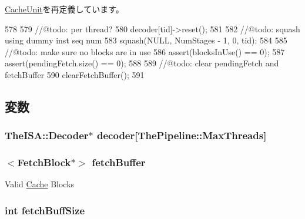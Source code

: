 \hyperlink{classCacheUnit_abf76d6d245f7d3b17d26ea8dcc0cf36f}{CacheUnit}を再定義しています。


\begin{DoxyCode}
578 {
579     //@todo: per thread?
580     decoder[tid]->reset();
581 
582     //@todo: squash using dummy inst seq num
583     squash(NULL, NumStages - 1, 0, tid);
584 
585     //@todo: make sure no blocks are in use
586     assert(blocksInUse() == 0);
587     assert(pendingFetch.size() == 0);
588 
589     //@todo: clear pendingFetch and fetchBuffer
590     clearFetchBuffer();
591 }
\end{DoxyCode}


\subsection{変数}
\hypertarget{classFetchUnit_a5f15f1b871b77f550632262df3bce5f1}{
\subsubsection[{decoder}]{\setlength{\rightskip}{0pt plus 5cm}TheISA::Decoder$\ast$ {\bf decoder}\mbox{[}{\bf ThePipeline::MaxThreads}\mbox{]}}}
\label{classFetchUnit_a5f15f1b871b77f550632262df3bce5f1}
\hypertarget{classFetchUnit_ab201075a98e275240766bee54144d42d}{
\subsubsection[{fetchBuffer}]{$<${\bf FetchBlock}$\ast$$>$ {\bf fetchBuffer}}}
\label{classFetchUnit_ab201075a98e275240766bee54144d42d}
Valid \hyperlink{classCache}{Cache} Blocks \hypertarget{classFetchUnit_a97e2b6a8af0f5cb34f9d266a9ac21a48}{
\subsubsection[{fetchBuffSize}]{\setlength{\rightskip}{0pt plus 5cm}int {\bf fetchBuffSize}}}
\label{classFetchUnit_a97e2b6a8af0f5cb34f9d266a9ac21a48}
